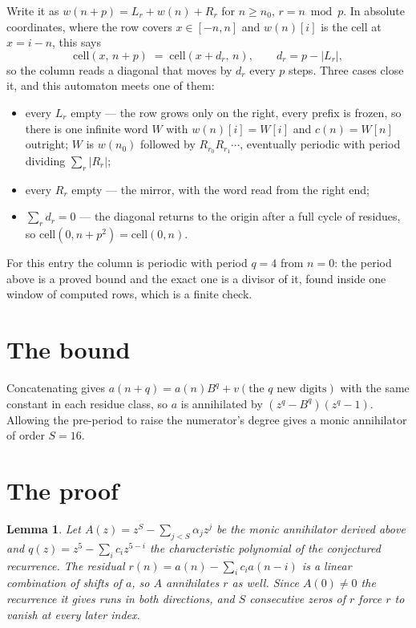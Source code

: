 \documentclass[11pt,a4paper]{article}
\theoremstyle{plain}
\newtheorem{lemma}[theorem]{Lemma}
\theoremstyle{definition}
\begin{document}
Write it as $w(n+p)=L_r+w(n)+R_r$ for $n\ge n_0$, $r=n \bmod p$. In absolute coordinates, where
the row covers $x\in[-n,n]$ and $w(n)[i]$ is the cell at $x=i-n$, this says
\[
\mathrm{cell}(x,\,n+p)\;=\;\mathrm{cell}(x+d_r,\,n),\qquad d_r=p-|L_r| ,
\]
so the column reads a diagonal that moves by $d_r$ every $p$ steps. Three cases close it, and
this automaton meets one of them:

\begin{itemize}
\item every $L_r$ empty --- the row grows only on the right, every prefix is frozen, so there
is one infinite word $W$ with $w(n)[i]=W[i]$ and $c(n)=W[n]$ outright; $W$ is $w(n_0)$ followed
by $R_{r_0}R_{r_1}\cdots$, eventually periodic with period dividing $\sum_r|R_r|$;
\item every $R_r$ empty --- the mirror, with the word read from the right end;
\item $\sum_r d_r=0$ --- the diagonal returns to the origin after a full cycle of residues, so
$\mathrm{cell}(0,n+p^2)=\mathrm{cell}(0,n)$.
\end{itemize}

For this entry the column is periodic with period $q=4$ from $n=0$: the period above is a
proved bound and the exact one is a divisor of it, found inside one window of computed rows,
which is a finite check.

\section{The bound}

Concatenating gives $a(n+q)=a(n)B^{q}+v(\text{the }q\text{ new digits})$ with the same constant in each residue class, so $a$ is annihilated by $(z^{q}-B^{q})(z^{q}-1)$.
Allowing the pre-period to raise the numerator's degree gives a monic annihilator of order
$S=16$.

\section{The proof}

\begin{lemma}\label{lem:crit}
Let $A(z)=z^S-\sum_{j<S}\alpha_jz^{j}$ be the monic annihilator derived above and
$q(z)=z^{5}-\sum_ic_iz^{5-i}$ the characteristic polynomial of the conjectured
recurrence. The residual $r(n)=a(n)-\sum_ic_ia(n-i)$ is a linear combination of shifts of $a$,
so $A$ annihilates $r$ as well. Since $A(0)\ne0$ the recurrence it gives runs in both
directions, and $S$ consecutive zeros of $r$ force $r$ to vanish at every later index.
\end{lemma}
\end{document}
